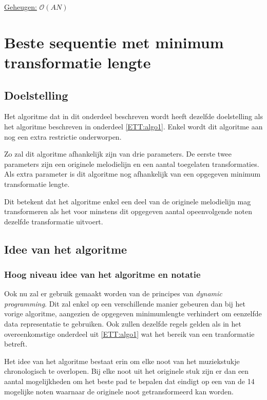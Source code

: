 \begin{center}
\underline{Geheugen:} $\mathcal{O}(AN)$
\end{center}

\section{Beste sequentie met minimum transformatie lengte}
\label{ETT:algo2}

\subsection{Doelstelling}
Het algoritme dat in dit onderdeel beschreven wordt heeft dezelfde doelstelling als het algoritme beschreven in onderdeel \ref{ETT:algo1}. Enkel wordt dit algoritme aan nog een extra restrictie onderworpen.

Zo zal dit algoritme afhankelijk zijn van drie parameters. De eerste twee parameters zijn een originele melodielijn en een aantal toegelaten transformaties. Als extra parameter is dit algoritme nog afhankelijk van een opgegeven minimum transformatie lengte.

Dit betekent dat het algoritme enkel een deel van de originele melodielijn mag transformeren als het voor minstens dit opgegeven aantal opeenvolgende noten dezelfde transformatie uitvoert.

\subsection{Idee van het algoritme}
\subsubsection{Hoog niveau idee van het algoritme en notatie}
Ook nu zal er gebruik gemaakt worden van de principes van \textit{dynamic programming}. Dit zal enkel op een verschillende manier gebeuren dan bij het vorige algoritme, aangezien de opgegeven minimumlengte verhindert om eenzelfde data representatie te gebruiken. Ook zullen dezelfde regels gelden als in het overeenkomstige onderdeel uit \ref{ETT:algo1} wat het bereik van een tranformatie betreft.

Het idee van het algoritme bestaat erin om elke noot van het muziekstukje chronologisch te overlopen. Bij elke noot uit het originele stuk zijn er dan een aantal mogelijkheden om het beste pad te bepalen dat eindigt op een van de 14 mogelijke noten waarnaar de originele noot getransformeerd kan worden.
 
